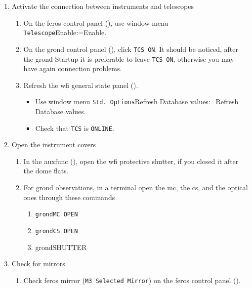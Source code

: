 \documentclass[11pt,fleqn,a4paper]{book}
\makeatletter
\def\menu#1#2{\texttt{#1}\ifx{}#2\else\@for\@x:=#2\do{$\rightarrow$\texttt{\@x}}\fi}
\def\wmenu#1#2{window menu \menu{#1}{#2}}
\makeatother
\begin{document}
\label{proc:insready}
\begin{enumerate}
   \item Activate the connection between instruments and telescopes
       \begin{enumerate}
         \item On the \gls{feros} control panel (), use \wmenu{Telescope}{Enable}.
         \item On the \gls{grond} control panel (), click \texttt{TCS ON}. It should be noticed,  after the \gls{grond} Startup it is preferable to leave \texttt{TCS ON}, otherwise you may have again connection problems.
         \item Refresh the \gls{wfi} general state panel ().
               \begin{itemize}
                 \item Use \wmenu{Std. Options}{Refresh Database values}.
                 \item Check that \texttt{TCS} is \texttt{ONLINE}.
               \end{itemize}
       \end{enumerate}
  \item  Open the instrument covers
    \label{list:opencov}
     \begin{enumerate}
        \item In the \gls{auxfunc} (), open the 
              \gls{wfi} \gls{protective shutter}, if you closed it after the dome flats.
        \item For \gls{grond} observations, in a terminal open the \gls{mc}, the \gls{cs}, and the optical ones through these commands
            \begin{enumerate}
              \item \texttt{\gls{grondMC} OPEN}
              \item \texttt{\gls{grondCS} OPEN}
              \item \gls{grondSHUTTER}
            \end{enumerate}
     \end{enumerate}
  \item Check for mirrors
     \label{list:checkmirror}
     \begin{enumerate}
        \item Check \gls{feros} mirror (\texttt{\gls{M3} Selected Mirror}) on the \gls{feros} control panel ().\\

\end{enumerate}
\end{enumerate}
\end{document}
